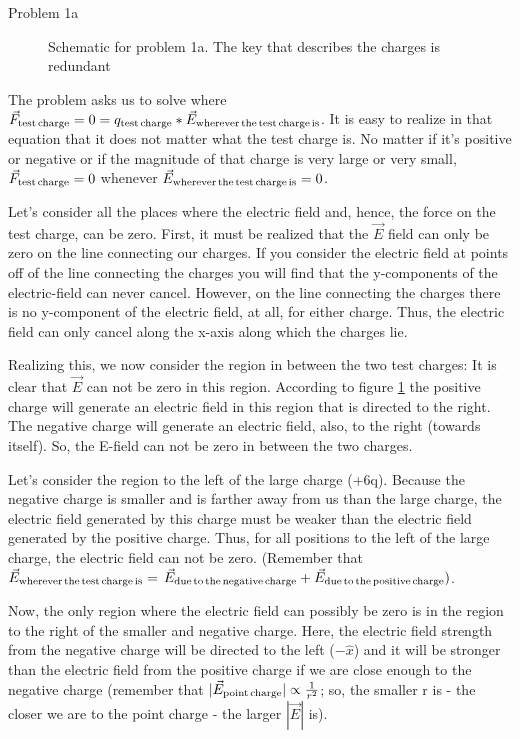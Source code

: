 \begin{homeworkProblem}
\begin{homeworkSection}{Problem 1a}
\begin{figure}
\caption{Schematic for problem 1a. The key that describes the charges is redundant}%
\label{fig:1a}%
\end{figure}

The problem asks us to solve where $\vec{F}_{\text{test\,charge}} = 0 = q_{\text{test\,charge}}*\vec{E}_{\text{wherever\,the\,test\,charge\,is}}$. It is easy to realize in that equation that it does not matter what the test charge is. No matter if it's positive or negative or if the magnitude of that charge is very large or very small, $\vec{F}_{\text{test\,charge}}=0$ whenever $\vec{E}_{\text{wherever\,the\,test\,charge\,is}} = 0$. 


Let's consider all the places where the electric field and, hence, the force on the test charge, can be zero. First, it must be realized that the $\vec{E}$ field can only be zero on the line connecting our charges. If you consider the electric field at points off of the line connecting the charges you will find that the y-components of the electric-field can never cancel. However, on the line connecting the charges there is no y-component of the electric field, at all, for either charge. Thus, the electric field can only cancel along the x-axis along which the charges lie.


Realizing this, we now consider the region in between the two test charges: It is clear that $\vec{E}$ can not be zero in this region. According to figure \ref{fig:1a} the positive charge will generate an electric field in this region that is directed to the right. The negative charge will generate an electric field, also, to the right (towards itself). So, the E-field can not be zero in between the two charges.


Let's consider the region to the left of the large charge (+6q). Because the negative charge is smaller and is farther away from us than the large charge, the electric field generated by this charge must be weaker than the electric field generated by the positive charge. Thus, for all positions to the left of the large charge, the electric field can not be zero. (Remember that $\vec{E}_{\text{wherever\,the\,test\,charge\,is}} =$ \newline $\vec{E}_{\text{due\,to\,the\,negative\,charge}}+ \vec{E}_{\text{due\,to\,the\,positive\,charge}})$.


Now, the only region where the electric field can possibly be zero is in the region to the right of the smaller and negative charge. Here, the electric field strength from the negative charge will be directed to the left ($-\hat{x}$) and it will be stronger than the electric field from the positive charge if we are close enough to the negative charge (remember that $|\vec{E}_{\text{point\,charge}}|\propto \frac{1}{r^2}$; so, the smaller r is - the closer we are to the point charge - the larger $|\vec{E}|$ is).


\end{homeworkSection}
\end{homeworkProblem}
